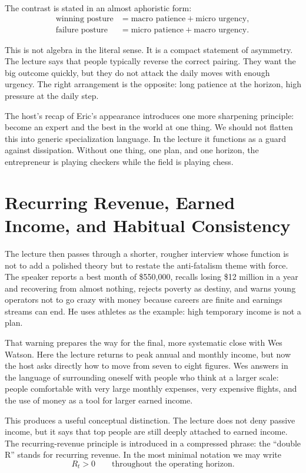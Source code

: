 The contrast is stated in an almost aphoristic form:
\begin{align}
\text{winning posture} &= \text{macro patience} + \text{micro urgency},\\
\text{failure posture} &= \text{micro patience} + \text{macro urgency}.
\end{align}

This is not algebra in the literal sense. It is a compact statement of asymmetry. The lecture says that people typically reverse the correct pairing. They want the big outcome quickly, but they do not attack the daily moves with enough urgency. The right arrangement is the opposite: long patience at the horizon, high pressure at the daily step.

The host's recap of Eric's appearance introduces one more sharpening principle: become an expert and the best in the world at one thing. We should not flatten this into generic specialization language. In the lecture it functions as a guard against dissipation. Without one thing, one plan, and one horizon, the entrepreneur is playing checkers while the field is playing chess.

\section{Recurring Revenue, Earned Income, and Habitual Consistency}

The lecture then passes through a shorter, rougher interview whose function is not to add a polished theory but to restate the anti-fatalism theme with force. The speaker reports a best month of \$550{,}000, recalls losing \$12 million in a year and recovering from almost nothing, rejects poverty as destiny, and warns young operators not to go crazy with money because careers are finite and earnings streams can end. He uses athletes as the example: high temporary income is not a plan.

That warning prepares the way for the final, more systematic close with Wes Watson. Here the lecture returns to peak annual and monthly income, but now the host asks directly how to move from seven to eight figures. Wes answers in the language of surrounding oneself with people who think at a larger scale: people comfortable with very large monthly expenses, very expensive flights, and the use of money as a tool for larger earned income.

This produces a useful conceptual distinction. The lecture does not deny passive income, but it says that top people are still deeply attached to earned income. The recurring-revenue principle is introduced in a compressed phrase: the ``double R'' stands for recurring revenue. In the most minimal notation we may write
\begin{equation}
R_t > 0 \qquad \text{throughout the operating horizon}.
\end{equation}

